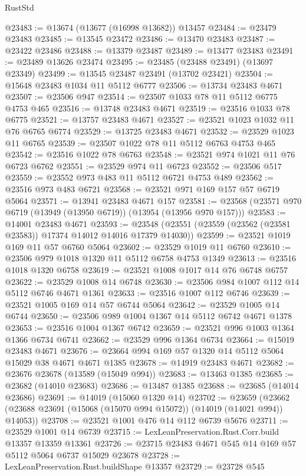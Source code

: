 \begin{lexlean}{RustStd}
\begin{coremodule}
@23483 := @13674 (@13677 (@16998 @13682)) @13457
@23484 := @23479 @23483
@23485 := @13545 @23472
@23486 := @13470 @23483
@23487 := @23422 @23486
@23488 := @13379 @23487
@23489 := @13477 @23483
@23491 := @23489 @13626 @23474
@23495 := @23485 (@23488 @23491) (@13697 @23349)
@23499 := @13545 @23487 @23491 (@13702 @23421)
@23504 := @15648 @23483 @1034 @11 @5112 @6777
@23506 := @13734 @23483 @4671
@23507 := @23506 @947
@23514 := @23507 @1033 @78 @11 @5112 @6775 @4753 @465
@23516 := @13748 @23483 @4671
@23519 := @23516 @1033 @78 @6775
@23521 := @13757 @23483 @4671
@23527 := @23521 @1023 @1032 @11 @76 @6765 @6774
@23529 := @13725 @23483 @4671
@23532 := @23529 @1023 @11 @6765
@23539 := @23507 @1022 @78 @11 @5112 @6763 @4753 @465
@23542 := @23516 @1022 @78 @6763
@23548 := @23521 @974 @1021 @11 @76 @6723 @6762
@23551 := @23529 @974 @11 @6723
@23552 := @23506 @517
@23559 := @23552 @973 @483 @11 @5112 @6721 @4753 @489
@23562 := @23516 @973 @483 @6721
@23568 := @23521 @971 @169 @157 @57 @6719 @5064
@23571 := @13941 @23483 @4671 @157
@23581 := @23568 (@23571 @970 @6719 (@13949 (@13950 @6719)) (@13954 (@13956 @970 @157)))
@23583 := @14001 @23483 @4671
@23593 := @23548 (@23551 (@23559 (@23562 (@23581 @23583)) @17374 @14012 @14016 @17379 @14030))
@23599 := @23521 @1019 @169 @11 @57 @6760 @5064
@23602 := @23529 @1019 @11 @6760
@23610 := @23506 @979 @1018 @1320 @11 @5112 @6758 @4753 @1349
@23613 := @23516 @1018 @1320 @6758
@23619 := @23521 @1008 @1017 @14 @76 @6748 @6757
@23622 := @23529 @1008 @14 @6748
@23630 := @23506 @984 @1007 @112 @14 @5112 @6746 @4671 @1361
@23633 := @23516 @1007 @112 @6746
@23639 := @23521 @1005 @169 @14 @57 @6744 @5064
@23642 := @23529 @1005 @14 @6744
@23650 := @23506 @989 @1004 @1367 @14 @5112 @6742 @4671 @1378
@23653 := @23516 @1004 @1367 @6742
@23659 := @23521 @996 @1003 @1364 @1366 @6734 @6741
@23662 := @23529 @996 @1364 @6734
@23664 := @15019 @23483 @4671
@23676 := @23664 @994 @169 @57 @1320 @14 @5112 @5064 @15029 @38 @4671 @4671 @1385
@23678 := @14919 @23483 @4671
@23682 := @23676 @23678 (@13589 (@15049 @994))
@23683 := @13463 @1385
@23685 := @23682 (@14010 @23683)
@23686 := @13487 @1385
@23688 := @23685 (@14014 @23686)
@23691 := @14019 (@15060 @1320 @14)
@23702 := @23659
    (@23662 (@23688 @23691 (@15068 (@15070 @994 @15072)) (@14019 (@14021 @994)) @14053))
@23708 := @23521 @1001 @476 @14 @112 @6739 @5676
@23711 := @23529 @1001 @14 @6739
@23715 := LexLeanPreservation.Rust.Corr.build @13357 @13359 @13361
@23726 := @23715 @23483 @4671 @545 @14 @169 @57 @5112 @5064 @6737 @15029 @23678
@23728 := LexLeanPreservation.Rust.buildShape @13357
@23729 := @23728 @545

\end{coremodule}
\end{lexlean}
